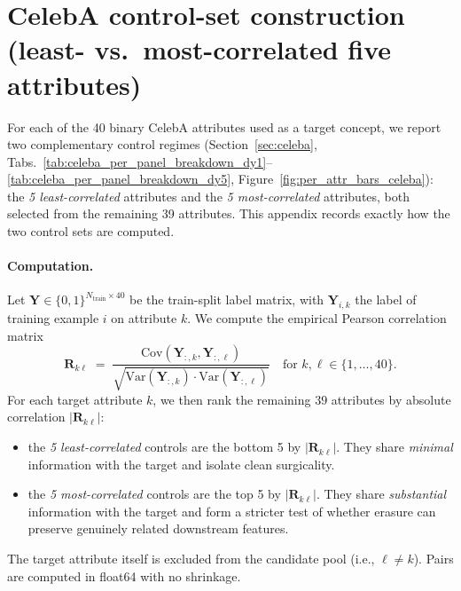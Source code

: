 \section{CelebA control-set construction (least- vs.\ most-correlated five attributes)}
\label{sec:appendix_celeba_controls}

For each of the 40 binary CelebA attributes used as a target concept, we report two complementary control regimes (Section~\ref{sec:celeba}, Tabs.~\ref{tab:celeba_per_panel_breakdown_dy1}--\ref{tab:celeba_per_panel_breakdown_dy5}, Figure~\ref{fig:per_attr_bars_celeba}): the \emph{5 least-correlated} attributes and the \emph{5 most-correlated} attributes, both selected from the remaining 39 attributes. This appendix records exactly how the two control sets are computed.

\paragraph{Computation.}
Let $\mathbf{Y} \in \{0, 1\}^{N_{\text{train}} \times 40}$ be the train-split label matrix, with $\mathbf{Y}_{i,k}$ the label of training example $i$ on attribute $k$. We compute the empirical Pearson correlation matrix
\begin{equation}
\mathbf{R}_{k\ell} \;=\; \frac{\mathrm{Cov}(\mathbf{Y}_{:,k}, \mathbf{Y}_{:,\ell})}{\sqrt{\mathrm{Var}(\mathbf{Y}_{:,k}) \cdot \mathrm{Var}(\mathbf{Y}_{:,\ell})}}
\quad \text{for } k, \ell \in \{1, \ldots, 40\}.
\end{equation}
For each target attribute $k$, we then rank the remaining $39$ attributes by absolute correlation $|\mathbf{R}_{k\ell}|$:
\begin{itemize}
\item the \emph{5 least-correlated} controls are the bottom 5 by $|\mathbf{R}_{k\ell}|$. They share \emph{minimal} information with the target and isolate clean surgicality.
\item the \emph{5 most-correlated} controls are the top 5 by $|\mathbf{R}_{k\ell}|$. They share \emph{substantial} information with the target and form a stricter test of whether erasure can preserve genuinely related downstream features.
\end{itemize}
The target attribute itself is excluded from the candidate pool (i.e., $\ell \neq k$). Pairs are computed in float64 with no shrinkage. 

